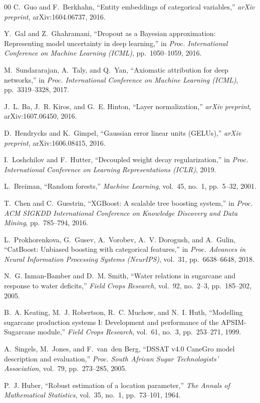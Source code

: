 \documentclass[conference,10pt,letterpaper]{IEEEtran}
\begin{document}
\begin{thebibliography}{00}
C.~Guo and F.~Berkhahn,
``Entity embeddings of categorical variables,''
\emph{arXiv preprint}, arXiv:1604.06737, 2016.

Y.~Gal and Z.~Ghahramani,
``Dropout as a Bayesian approximation: Representing model uncertainty in
deep learning,''
in \emph{Proc. International Conference on Machine Learning (ICML)},
pp.~1050--1059, 2016.

M.~Sundararajan, A.~Taly, and Q.~Yan,
``Axiomatic attribution for deep networks,''
in \emph{Proc. International Conference on Machine Learning (ICML)},
pp.~3319--3328, 2017.

J.~L. Ba, J.~R. Kiros, and G.~E. Hinton,
``Layer normalization,''
\emph{arXiv preprint}, arXiv:1607.06450, 2016.

D.~Hendrycks and K.~Gimpel,
``Gaussian error linear units (GELUs),''
\emph{arXiv preprint}, arXiv:1606.08415, 2016.

I.~Loshchilov and F.~Hutter,
``Decoupled weight decay regularization,''
in \emph{Proc. International Conference on Learning Representations (ICLR)}, 2019.

L.~Breiman,
``Random forests,''
\emph{Machine Learning}, vol.~45, no.~1, pp.~5--32, 2001.

T.~Chen and C.~Guestrin,
``XGBoost: A scalable tree boosting system,''
in \emph{Proc. ACM SIGKDD International Conference on Knowledge Discovery
and Data Mining}, pp.~785--794, 2016.

L.~Prokhorenkova, G.~Gusev, A.~Vorobev, A.~V. Dorogush, and A.~Gulin,
``CatBoost: Unbiased boosting with categorical features,''
in \emph{Proc. Advances in Neural Information Processing Systems (NeurIPS)},
vol.~31, pp.~6638--6648, 2018.

N.~G. Inman-Bamber and D.~M. Smith,
``Water relations in sugarcane and response to water deficits,''
\emph{Field Crops Research}, vol.~92, no.~2--3, pp.~185--202, 2005.

B.~A. Keating, M.~J. Robertson, R.~C. Muchow, and N.~I. Huth,
``Modelling sugarcane production systems I: Development and performance
of the APSIM-Sugarcane module,''
\emph{Field Crops Research}, vol.~61, no.~3, pp.~253--271, 1999.

A.~Singels, M.~Jones, and F.~van~den Berg,
``DSSAT v4.0 CaneGro model description and evaluation,''
\emph{Proc. South African Sugar Technologists' Association},
vol.~79, pp.~273--285, 2005.

P.~J. Huber,
``Robust estimation of a location parameter,''
\emph{The Annals of Mathematical Statistics}, vol.~35, no.~1, pp.~73--101, 1964.

\end{thebibliography}
\end{document}

